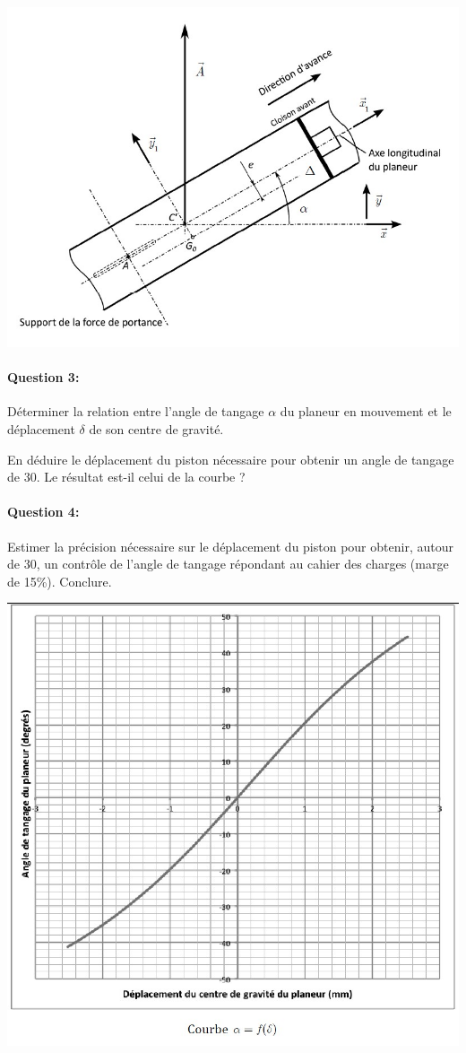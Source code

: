 \begin{center}
\includegraphics[width=0.7\linewidth]{img/plan_Q2.jpg}
\end{center}

\begin{minipage}{0.58\linewidth}
\paragraph{Question 3:} Déterminer la relation entre l'angle de tangage $\alpha$ du planeur en mouvement et le déplacement $\delta$ de son centre de gravité.

En déduire le déplacement du piston nécessaire pour obtenir un angle de tangage de 30\textdegree. Le résultat est-il celui de la courbe ? 

\paragraph{Question 4:} Estimer la précision nécessaire sur le déplacement du piston pour obtenir, autour de 30\textdegree, un contrôle de l'angle de tangage répondant au cahier des charges (marge de 15\%). Conclure.
\end{minipage}
\hfill
\begin{minipage}{0.4\linewidth}
\centering\includegraphics[width=0.9\linewidth]{img/plan_Q3.jpg}
\end{minipage}

